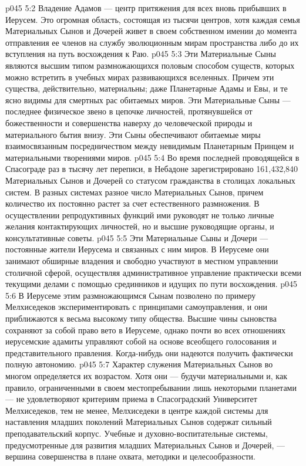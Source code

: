 \vs p045 5:2 Владение Адамов --- центр притяжения для всех вновь прибывших в Иерусем. Это огромная область, состоящая из тысячи центров, хотя каждая семья Материальных Сынов и Дочерей живет в своем собственном имении до момента отправления ее членов на службу эволюционным мирам пространства либо до их вступления на путь восхождения к Раю.
\vs p045 5:3 Эти Материальные Сыны являются высшим типом размножающихся половым способом существ, которых можно встретить в учебных мирах развивающихся вселенных. Причем эти существа, действительно, материальны; даже Планетарные Адамы и Евы, и те ясно видимы для смертных рас обитаемых миров. Эти Материальные Сыны --- последнее физическое звено в цепочке личностей, протянувшейся от божественности и совершенства наверху до человеческой природы и материального бытия внизу. Эти Сыны обеспечивают обитаемые миры взаимосвязанным посредничеством между невидимым Планетарным Принцем и материальными творениями миров.
\vs p045 5:4 \pc Во время последней проводящейся в Спасограде раз в тысячу лет переписи, в Небадоне зарегистрировано 161,432,840 Материальных Сынов и Дочерей со статусом гражданства в столицах локальных систем. В разных системах разное число Материальных Сынов, причем количество их постоянно растет за счет естественного размножения. В осуществлении репродуктивных функций ими руководят не только личные желания контактирующих личностей, но и высшие руководящие органы, и консультативные советы.
\vs p045 5:5 \pc Эти Материальные Сыны и Дочери --- постоянные жители Иерусема и связанных с ним миров. В Иерусеме они занимают обширные владения и свободно участвуют в местном управлении столичной сферой, осуществляя административное управление практически всеми текущими делами с помощью срединников и идущих по пути восхождения.
\vs p045 5:6 В Иерусеме этим размножающимся Сынам позволено по примеру Мелхиседеков экспериментировать с принципами самоуправления, и они приближаются к весьма высокому типу общества. Высшие чины сыновства сохраняют за собой право вето в Иерусеме, однако почти во всех отношениях иерусемские адамиты управляют собой на основе всеобщего голосования и представительного правления. Когда\hyp{}нибудь они надеются получить фактически полную автономию.
\vs p045 5:7 Характер служения Материальных Сынов во многом определяется их возрастом. Хотя они --- будучи материальными и, как правило, ограниченными в своем местопребывании лишь некоторыми планетами --- не удовлетворяют критериям приема в Спасоградский Университет Мелхиседеков, тем не менее, Мелхиседеки в центре каждой системы для наставления младших поколений Материальных Сынов содержат сильный преподавательский корпус. Учебные и духовно\hyp{}воспитательные системы, предусмотренные для развития младших Материальных Сынов и Дочерей, --- вершина совершенства в плане охвата, методики и целесообразности.
